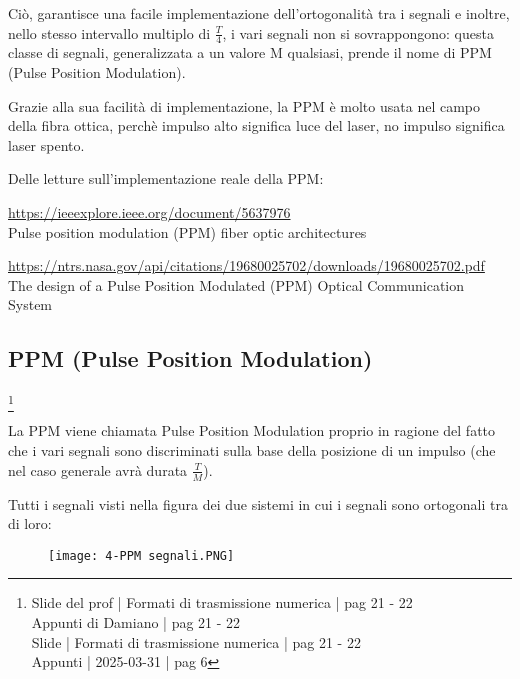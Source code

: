 Ciò, garantisce una facile implementazione dell'ortogonalità tra i segnali e inoltre, 
nello stesso intervallo multiplo di $\frac{T}{4}$, i vari segnali non si sovrappongono: 
questa classe di segnali, generalizzata a un valore M qualsiasi, 
prende il nome di PPM (Pulse Position Modulation). \newline 

\begin{tcolorbox}
    Grazie alla sua facilità di implementazione, la PPM è molto usata nel campo della fibra ottica, perchè impulso alto significa luce del laser, no impulso significa laser spento. \newline 

    Delle letture sull'implementazione reale della PPM: \newline 

    \url{https://ieeexplore.ieee.org/document/5637976} \\
    Pulse position modulation (PPM) fiber optic architectures \newline 

    \url{https://ntrs.nasa.gov/api/citations/19680025702/downloads/19680025702.pdf} \\
    The design of a Pulse Position Modulated (PPM) Optical Communication System 

\end{tcolorbox}

\newpage 

\subsection{PPM (Pulse Position Modulation)}
\footnote{Slide del prof | Formati di trasmissione numerica | pag 21 - 22\\  
Appunti di Damiano | pag 21 - 22\\
Slide | Formati di trasmissione numerica | pag  21 - 22\\
Appunti | 2025-03-31 | pag 6
}

La PPM viene chiamata Pulse Position Modulation proprio in ragione del fatto che i vari segnali sono discriminati sulla base della posizione di un impulso 
(che nel caso generale avrà durata $\frac{T}{M}$). \newline 

Tutti i segnali visti nella figura dei due sistemi in cui i segnali sono ortogonali tra di loro:

\begin{figure}[h]
    \centering
    \texttt{[image: 4-PPM segnali.PNG]}
\end{figure} 

